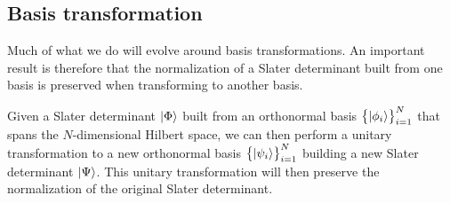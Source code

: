         \subsection{Basis transformation}
            Much of what we do will evolve around basis transformations.
            An important result is therefore that the normalization of a Slater
            determinant built from one basis is preserved when transforming to
            another basis.
            \begin{lemma}
                Given a Slater determinant $\ket{\Phi}$ built from an
                orthonormal basis $\left\{ \ket{\phi_i} \right\}_{i = 1}^{N}$ that spans
                the $N$-dimensional Hilbert space, we can then perform a unitary
                transformation to a new orthonormal basis
                $\left\{ \ket{\psi_i} \right\}_{i = 1}^{N}$ building a new Slater
                determinant $\ket{\Psi}$.
                This unitary transformation will then preserve the normalization
                of the original Slater determinant.
            \end{lemma}

